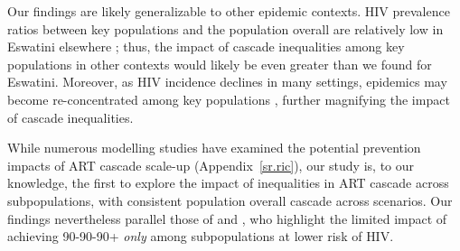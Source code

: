\par
Our findings are likely generalizable to other epidemic contexts.
HIV prevalence ratios between key populations and the population overall
are relatively low in Eswatini \vs elsewhere \cite{Baral2012,Hessou2019};
thus, the impact of cascade inequalities among key populations in other contexts
would likely be even greater than we found for Eswatini.
Moreover, as HIV incidence declines in many settings,
epidemics may become re-concentrated among key populations \cite{Brown2019,Garnett2021},
further magnifying the impact of cascade inequalities.
\par
While numerous modelling studies have examined
the potential prevention impacts of ART cascade scale-up
\cite{Knight2022sr} (Appendix~\ref{sr.ric}),
our study is, to our knowledge, the first to explore the impact of
inequalities in ART cascade across subpopulations,
with consistent population overall cascade across scenarios.
Our findings nevertheless parallel those of
\citet{Maheu-Giroux2017art} and \citet{Marukutira2020},
who highlight the limited impact of achieving 90-90-90+
\emph{only} among subpopulations at lower risk of HIV.
